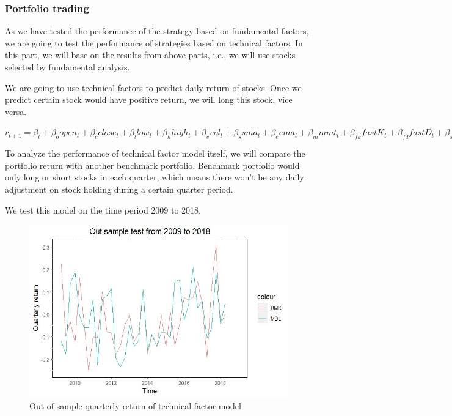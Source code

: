 \documentclass[]{article}
\begin{document}
\hypertarget{portfolio-trading}{%
\subsubsection{Portfolio trading}\label{portfolio-trading}}

As we have tested the performance of the strategy based on fundamental
factors, we are going to test the performance of strategies based on
technical factors. In this part, we will base on the results from above
parts, i.e., we will use stocks selected by fundamental analysis.

We are going to use technical factors to predict daily return of stocks.
Once we predict certain stock would have positive return, we will long
this stock, vice versa.

\(\displaystyle r_{t+1} = \beta_t + \beta_oopen_t+\beta_cclose_t+\beta_llow_t+\beta_hhigh_t+\beta_vvol_t+\beta_ssma_t+\beta_eema_t+\beta_mmmt_t+\beta_{fk}fastK_t+\beta_{fd}fastD_t + \beta_{sd}slowD_t+\beta_rrsi_t+\beta_{macd}macd_t+\beta_{lwr}lwr_t+\beta_aadi_t+\beta_ccci_t\)

To analyze the performance of technical factor model itself, we will
compare the portfolio return with another benchmark portfolio. Benchmark
portfolio would only long or short stocks in each quarter, which means
there won't be any daily adjustment on stock holding during a certain
quarter period.

We test this model on the time period 2009 to 2018.

\begin{figure}[H]
\begin{center}
\includegraphics[width=5in]{Lab//full_model.jpg}
\caption{Out of sample quarterly return of technical factor model}
\label{figure16}
\end{center}
\end{figure}
\end{document}
